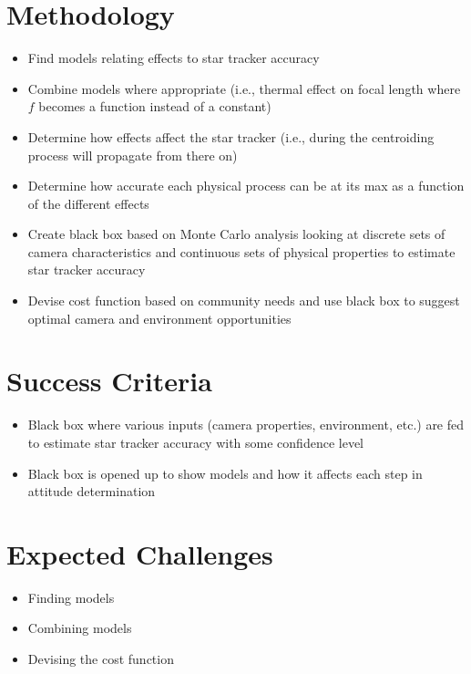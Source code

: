 \section{Methodology}
\begin{itemize}
    \item Find models relating effects to star tracker accuracy 
    \item Combine models where appropriate (i.e., thermal effect on focal length where $f$ becomes a function instead of a constant)
    \item Determine how effects affect the star tracker (i.e., during the centroiding process will propagate from there on)
    \item Determine how accurate each physical process can be at its max as a function of the different effects
    \item Create black box based on Monte Carlo analysis looking at discrete sets of camera characteristics and continuous sets of physical properties to estimate star tracker accuracy
    \item Devise cost function based on community needs and use black box to suggest optimal camera and environment opportunities 
\end{itemize}

\section{Success Criteria}
\begin{itemize}
    \item Black box where various inputs (camera properties, environment, etc.) are fed to estimate star tracker accuracy with some confidence level
    \item Black box is opened up to show models and how it affects each step in attitude determination 
\end{itemize}

\section{Expected Challenges}
\begin{itemize}
    \item Finding models
    \item Combining models 
    \item Devising the cost function 
\end{itemize}

